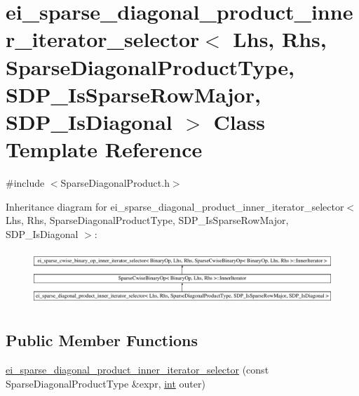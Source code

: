 \hypertarget{classei__sparse__diagonal__product__inner__iterator__selector_3_01_lhs_00_01_rhs_00_01_sparse_dif8677b5f48ea8b4e127f144375264c46}{\section{ei\-\_\-sparse\-\_\-diagonal\-\_\-product\-\_\-inner\-\_\-iterator\-\_\-selector$<$ Lhs, Rhs, Sparse\-Diagonal\-Product\-Type, S\-D\-P\-\_\-\-Is\-Sparse\-Row\-Major, S\-D\-P\-\_\-\-Is\-Diagonal $>$ Class Template Reference}
\label{classei__sparse__diagonal__product__inner__iterator__selector_3_01_lhs_00_01_rhs_00_01_sparse_dif8677b5f48ea8b4e127f144375264c46}
}


{\ttfamily \#include $<$Sparse\-Diagonal\-Product.\-h$>$}

Inheritance diagram for ei\-\_\-sparse\-\_\-diagonal\-\_\-product\-\_\-inner\-\_\-iterator\-\_\-selector$<$ Lhs, Rhs, Sparse\-Diagonal\-Product\-Type, S\-D\-P\-\_\-\-Is\-Sparse\-Row\-Major, S\-D\-P\-\_\-\-Is\-Diagonal $>$\-:\begin{figure}[H]
\begin{center}
\leavevmode
\includegraphics[height=2.081784cm]{classei__sparse__diagonal__product__inner__iterator__selector_3_01_lhs_00_01_rhs_00_01_sparse_dif8677b5f48ea8b4e127f144375264c46}
\end{center}
\end{figure}
\subsection*{Public Member Functions}
\begin{DoxyCompactItemize}
\item 
\hyperlink{classei__sparse__diagonal__product__inner__iterator__selector_3_01_lhs_00_01_rhs_00_01_sparse_dif8677b5f48ea8b4e127f144375264c46_a2fe15488e3bc3c18697a16fbc72427e9}{ei\-\_\-sparse\-\_\-diagonal\-\_\-product\-\_\-inner\-\_\-iterator\-\_\-selector} (const Sparse\-Diagonal\-Product\-Type \&expr, \hyperlink{ioapi_8h_a787fa3cf048117ba7123753c1e74fcd6}{int} outer)
\end{DoxyCompactItemize}
